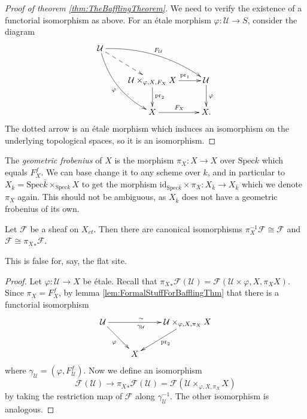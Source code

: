 \begin{proof}[Proof of theorem \ref{thm:TheBafflingTheorem}]
We need to verify the existence of a functorial isomorphism as above. For an 
\'etale morphism $\varphi: \mathcal{U} \to S$, consider the diagram
$$
\xymatrix{
\mathcal{U} \ar@{-->}[rd] \ar^{F_\mathcal{U}}@/^1pc/[rrd] 
\ar_{\varphi}@/_1pc/[rdd] \\
& {\mathcal{U} \times_{\varphi, X,F_X} X} \ar^{\qquad \text{pr}_1 \ \ }[r] 
\ar^{\text{pr}_2}[d] & \mathcal{U} \ar^{\varphi}[d] \\
& X \ar^{F_X}[r] & X.
}
$$
The dotted arrow is an \'etale morphism which induces an isomorphism on the 
underlying topological spaces, so it is an isomorphism.
\end{proof}


\begin{definition}
The {\it geometric frobenius} of $X$ is the morphism $\pi_X : X \to X$ over 
$\text{Spec} k$ which equals $F_X^f$. We can base change it to any scheme over 
$k$, and in particular to $X_{\bar k} = \text{Spec}  \bar k \times_{\text{Spec} 
k} X$ to get the morphism $\text{id}_{\text{Spec} \bar k } \times \pi_X : 
X_{\bar k} \to X_{\bar k}$ which we denote $\pi_X$ again. This should not be 
ambiguous, as $X_{\bar k}$ does not have a geometric frobenius of its own.
\end{definition}

\begin{lemma}
Let $\mathcal{F}$ be a sheaf on $X_{et}$. Then there are canonical isomorphisms 
$\pi_X^{-1} \mathcal{F} \cong \mathcal{F}$ and $\mathcal{F} \cong {\pi_X}_* 
\mathcal{F}$.
\end{lemma}

This is false for, say, the flat site.

\begin{proof}
Let $\varphi: \mathcal{U} \to X$ be \'etale. Recall that ${\pi_X}_* \mathcal{F} 
(\mathcal{U}) = \mathcal{F} (\mathcal{U} \times{\varphi, X, \pi_X} X)$. Since 
$\pi_X = F_X^f$, by lemma \ref{lem:FormalStuffForBafflingThm} that there is a 
functorial isomorphism
$$
\xymatrix{
\mathcal{U} \ar_{\varphi}[rd] \ar^{\sim \quad}_{\gamma_\mathcal{U} \quad}[rr] 
&&  {\mathcal{U} \times_{\varphi, X, \pi_X} X} \ar^{\text{pr}_2}[ld]\\
& X
}
$$
where $\gamma_\mathcal{U} = (\varphi, F_\mathcal{U}^f)$. Now we define an 
isomorphism
$$
\mathcal{F} (\mathcal{U}) \longrightarrow {\pi_X}_* \mathcal{F} (\mathcal{U}) = 
\mathcal{F} (\mathcal{U} \times_{\varphi, X, \pi_X} X)
$$
by taking the restriction map of $\mathcal{F}$ along $\gamma_\mathcal{U}^{-1}$. 
The other isomorphism is analogous. 
\end{proof}

